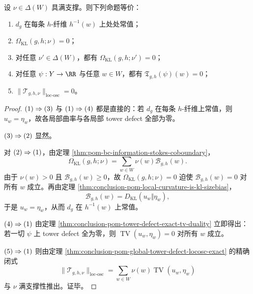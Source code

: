 \begin{corollary}\label{cor:conclusion-pom-curvature-and-tower-defect-same-kernel}
设 \(\nu\in\Delta(W)\) 具满支撑。则下列命题等价：
\begin{enumerate}
  \item \(d_g\) 在每条 \(h\)-纤维 \(h^{-1}(w)\) 上处处常值；
  \item \(\Omega_{\mathrm{KL}}(g,h;\nu)=0\)；
  \item 对任意 \(\nu'\in\Delta(W)\)，都有 \(\Omega_{\mathrm{KL}}(g,h;\nu')=0\)；
  \item 对任意 \(\psi:Y\to\RR\) 与任意 \(w\in W\)，都有 \(\mathfrak T_{g,h}(\psi)(w)=0\)；
  \item \(\|\mathcal T_{g,h,\nu}\|_{\mathrm{loc\mbox{-}osc}}=0\)。
\end{enumerate}
\end{corollary}
\begin{proof}
\(\textup{(1)}\Rightarrow\textup{(3)}\) 与 \(\textup{(1)}\Rightarrow\textup{(4)}\) 都是直接的：若 \(d_g\) 在每条 \(h\)-纤维上常值，则 \(u_w=\eta_w\)，故各局部曲率与各局部 tower defect 全部为零。

\(\textup{(3)}\Rightarrow\textup{(2)}\) 显然。

对 \(\textup{(2)}\Rightarrow\textup{(1)}\)，由定理 \ref{thm:pom-bc-information-stokes-coboundary}，
\[
\Omega_{\mathrm{KL}}(g,h;\nu)=\sum_{w\in W}\nu(w)\mathcal B_{g,h}(w).
\]
由于 \(\nu(w)>0\) 且 \(\mathcal B_{g,h}(w)\ge 0\)，故 \(\Omega_{\mathrm{KL}}(g,h;\nu)=0\) 迫使 \(\mathcal B_{g,h}(w)=0\) 对所有 \(w\) 成立。再由定理 \ref{thm:conclusion-pom-local-curvature-is-kl-sizebias}，
\[
\mathcal B_{g,h}(w)=D_{\mathrm{KL}}(u_w\Vert \eta_w),
\]
于是 \(u_w=\eta_w\)，从而 \(d_g\) 在 \(h^{-1}(w)\) 上常值。

\(\textup{(4)}\Rightarrow\textup{(1)}\) 由定理 \ref{thm:conclusion-pom-tower-defect-exact-tv-duality} 立即得出：若一切 \(\psi\) 上 tower defect 全为零，则 \(\operatorname{TV}(u_w,\eta_w)=0\) 对所有 \(w\) 成立。

\(\textup{(5)}\Rightarrow\textup{(1)}\) 则由定理 \ref{thm:conclusion-pom-global-tower-defect-locosc-exact} 的精确闭式
\[
\|\mathcal T_{g,h,\nu}\|_{\mathrm{loc\mbox{-}osc}}
=
\sum_{w\in W}\nu(w)\operatorname{TV}(u_w,\eta_w)
\]
与 \(\nu\) 满支撑性推出。证毕。
\end{proof}

